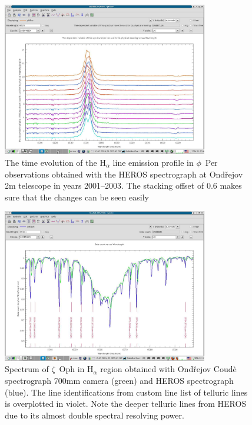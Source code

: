 \documentclass[final,authoryear,5p,times,twocolumn]{elsarticle}
\begin{document}
\begin{figure}[t]
\begin{center}
\includegraphics[width=0.8\textwidth]{phiper-heros-stack.pdf}
\caption{The time evolution of the H$_\alpha$ line emission profile in
$\phi$~Per observations obtained with the HEROS spectrograph at Ond\v{r}ejov 2m
telescope in years 2001--2003. The stacking offset of 0.6  makes sure that the changes can be seen easily}

\label{fig:phiper-heros-stack}
\end{center}
\end{figure}

\begin{figure}[t]
\begin{center}
\includegraphics[width=0.8\textwidth]{zetoph2sp-id.pdf}
\caption{Spectrum of $\zeta$~Oph in H$_\alpha$ region  obtained with Ond\v{r}ejov Coud\`e
  spectrograph 700mm camera (green) and HEROS spectrograph (blue). The line
  identifications from custom line list of telluric lines is overplotted in violet. Note the deeper
  telluric lines from HEROS due to its almost double spectral resolving power.}
\label{fig:zetoph2sp-id}
\end{center}
\end{figure}
\end{document}
